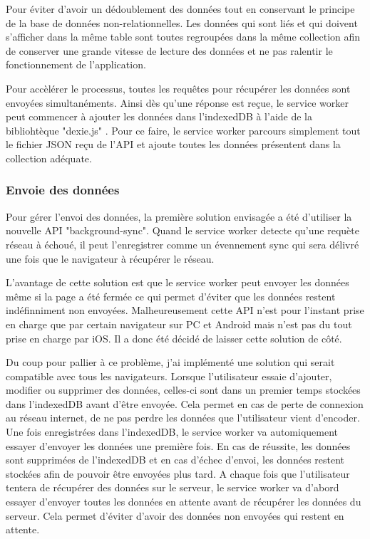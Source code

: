 \documentclass{EPL-master-thesis-covers-FR}
\begin{document}
					Pour éviter d'avoir un dédoublement des données tout en conservant le principe de la base de données non-relationnelles. Les données qui sont liés et qui doivent s'afficher dans la même table sont toutes regroupées dans la même collection afin de conserver une grande vitesse de lecture des données et ne pas ralentir le fonctionnement de l'application.
							
					Pour accèlérer le processus, toutes les requêtes pour récupérer les données sont envoyées simultanéments. Ainsi dès qu'une réponse est reçue, le service worker peut commencer à ajouter les données dans l'indexedDB à l'aide de la bibliohtèque "dexie.js" \cite{ref:dexie}. Pour ce faire, le service worker parcours simplement tout le fichier JSON reçu de l'API et ajoute toutes les données présentent dans la collection adéquate.
				
				\subsubsection*{Envoie des données}
					Pour gérer l'envoi des données, la première solution envisagée a été d'utiliser la nouvelle API "background-sync". Quand le service worker detecte qu'une requète réseau à échoué, il peut l'enregistrer comme un évennement sync qui sera délivré une fois que le navigateur à récupérer le réseau. 
					
					L'avantage de cette solution est que le service worker peut envoyer les données même si la page a été fermée ce qui permet d'éviter que les données restent indéfinniment non envoyées. Malheureusement cette API n'est pour l'instant prise en charge que par certain navigateur sur PC et Android mais n'est pas du tout prise en charge par iOS. Il a donc été décidé de laisser cette solution de côté.
					
					Du coup pour pallier à ce problème, j'ai implémenté une solution qui serait compatible avec tous les navigateurs. Lorsque l'utilisateur essaie d'ajouter, modifier ou supprimer des données, celles-ci sont dans un premier temps stockées dans l'indexedDB avant d'être envoyée. Cela permet en cas de perte de connexion au réseau internet, de ne pas perdre les données que l'utilisateur vient d'encoder. Une fois enregistrées dans l'indexedDB, le service worker va automiquement essayer d'envoyer les données une première fois. En cas de réussite, les données sont supprimées de l'indexedDB et en cas d'échec d'envoi, les données restent stockées afin de pouvoir être envoyées plus tard. A chaque fois que l'utilisateur tentera de récupérer des données  sur le serveur, le service worker va d'abord essayer d'envoyer toutes les données en attente avant de récupérer les données du serveur. Cela permet d'éviter d'avoir des données non envoyées qui restent  en attente.
					
\end{document}
